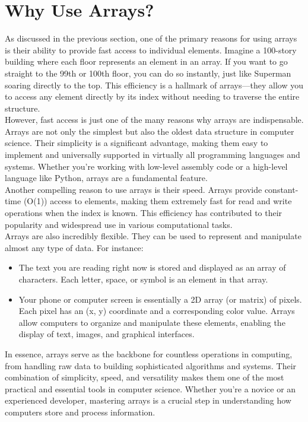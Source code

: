 \documentclass[12pt, oneside]{book}
\begin{document}
	\section{Why Use Arrays?}
	As discussed in the previous section, one of the primary reasons for using arrays is their ability to provide fast access to individual elements. Imagine a 100-story building where each floor represents an element in an array. If you want to go straight to the 99th or 100th floor, you can do so instantly, just like Superman soaring directly to the top. This efficiency is a hallmark of arrays—they allow you to access any element directly by its index without needing to traverse the entire structure.\\
	However, fast access is just one of the many reasons why arrays are indispensable. Arrays are not only the simplest but also the oldest data structure in computer science. Their simplicity is a significant advantage, making them easy to implement and universally supported in virtually all programming languages and systems. Whether you're working with low-level assembly code or a high-level language like Python, arrays are a fundamental feature.\\
	Another compelling reason to use arrays is their speed. Arrays provide constant-time (O(1)) access to elements, making them extremely fast for read and write operations when the index is known. This efficiency has contributed to their popularity and widespread use in various computational tasks.\\
	Arrays are also incredibly flexible. They can be used to represent and manipulate almost any type of data. For instance:\\
	\begin{itemize}
		\item The text you are reading right now is stored and displayed as an array of characters. Each letter, space, or symbol is an element in that array.
		\item Your phone or computer screen is essentially a 2D array (or matrix) of pixels. Each pixel has an (x, y) coordinate and a corresponding color value. Arrays allow computers to organize and manipulate these elements, enabling the display of text, images, and graphical interfaces.
	\end{itemize}
	In essence, arrays serve as the backbone for countless operations in computing, from handling raw data to building sophisticated algorithms and systems. Their combination of simplicity, speed, and versatility makes them one of the most practical and essential tools in computer science. Whether you're a novice or an experienced developer, mastering arrays is a crucial step in understanding how computers store and process information. 
\end{document}
